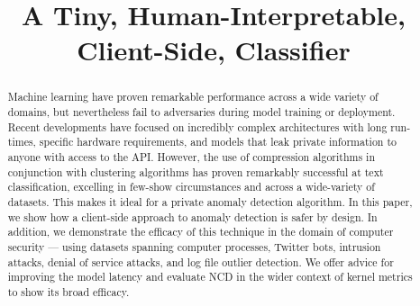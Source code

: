 \documentclass[conference]{IEEEtran}
\begin{document}
\title{A Tiny, Human-Interpretable, Client-Side, Classifier}


\author{
    
 
    
    
}

\maketitle

\begin{abstract}
  Machine learning have proven remarkable performance across a wide variety of domains, but nevertheless fail to adversaries during model training or deployment. 
  Recent developments have focused on incredibly complex architectures with long run-times, specific hardware requirements, and models that leak private information to anyone with access to the API.  
  However, the use of compression algorithms in conjunction with clustering algorithms has proven remarkably successful at text classification, excelling in few-show circumstances and across a wide-variety of datasets. This makes it ideal for a private anomaly detection algorithm. In this paper, we show how a client-side approach to anomaly detection is safer by design.
  In addition, we demonstrate the efficacy of this technique in the domain of computer security --- using datasets spanning computer processes, Twitter bots, intrusion attacks, denial of service attacks, and log file outlier detection.
  We offer advice for improving the model latency and evaluate NCD in the wider context of kernel metrics to show its broad efficacy.
\end{abstract}
\end{document}

